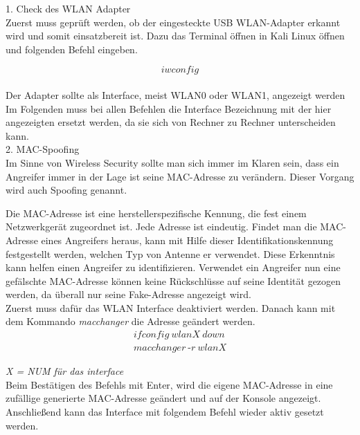 {\Large 1. Check des WLAN Adapter}\\

Zuerst muss geprüft werden, ob der eingesteckte USB WLAN-Adapter erkannt wird und somit einsatzbereit ist. Dazu das Terminal öffnen in Kali Linux öffnen und folgenden Befehl eingeben. 

$$iwconfig$$\\

Der Adapter sollte als Interface, meist WLAN0 oder WLAN1, angezeigt werden\\
Im Folgenden muss bei allen Befehlen die Interface Bezeichnung mit der hier angezeigten ersetzt werden, da sie sich von Rechner zu Rechner unterscheiden kann.\\


{\Large 2. MAC-Spoofing}\\

Im Sinne von Wireless Security sollte man sich immer im Klaren sein, dass ein Angreifer immer in der Lage ist seine MAC-Adresse zu verändern. Dieser Vorgang wird auch Spoofing genannt.

Die MAC-Adresse ist eine herstellerspezifische Kennung, die fest einem Netzwerkgerät zugeordnet ist. Jede Adresse ist eindeutig. Findet man die MAC-Adresse eines Angreifers heraus, kann mit Hilfe dieser Identifikationskennung festgestellt werden, welchen Typ von Antenne er verwendet. Diese Erkenntnis kann helfen einen Angreifer zu identifizieren.
Verwendet ein Angreifer nun eine gefälschte MAC-Adresse können keine Rückschlüsse auf seine Identität gezogen werden, da überall nur seine Fake-Adresse angezeigt wird.\\

Zuerst muss dafür das WLAN Interface deaktiviert werden. Danach kann mit dem Kommando \textit{macchanger} die Adresse geändert werden.\\

\begin{equation*}
\begin{split}
ifconfig~wlanX~down\\
macchanger~\text{-}r~wlanX
\end{split}
\end{equation*}

\textit{X = NUM für das interface}\\

Beim Bestätigen des Befehls mit Enter, wird die eigene MAC-Adresse in eine zufällige generierte MAC-Adresse geändert und auf der Konsole angezeigt. Anschließend kann das Interface mit folgendem Befehl wieder aktiv gesetzt werden.\\
 
